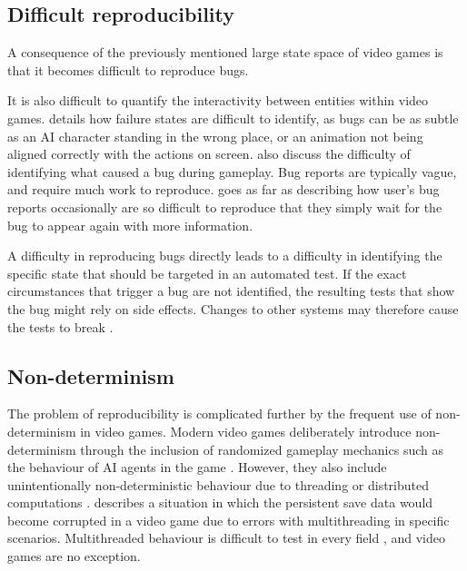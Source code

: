 \documentclass{article}
\begin{document}
    \subsection{Difficult reproducibility}
    A consequence of the previously mentioned large state space of video games is that it becomes difficult to reproduce bugs. 

    It is also difficult to quantify the interactivity between entities within video games. \textcite{gilbert2018unit} details how failure states are difficult to identify, as bugs can be as subtle as an AI character standing in the wrong place, or an animation not being aligned correctly with the actions on screen. \textcite{gilbert2018unit,murphy2014cowboys} also discuss the difficulty of identifying what caused a bug during gameplay. Bug reports are typically vague, and require much work to reproduce. \textcite{yarwood2020qa} goes as far as describing how user's bug reports occasionally are so difficult to reproduce that they simply wait for the bug to appear again with more information. 

    A difficulty in reproducing bugs directly leads to a difficulty in identifying the specific state that should be targeted in an automated test. If the exact circumstances that trigger a bug are not identified, the resulting tests that show the bug might rely on side effects. Changes to other systems may therefore cause the tests to break \parencite{murphy2014cowboys}.

    \subsection{Non-determinism}
    The problem of reproducibility is complicated further by the frequent use of non-determinism in video games. Modern video games deliberately introduce non-determinism through the inclusion of randomized gameplay mechanics such as the behaviour of AI agents in the game \parencite{murphy2014cowboys}. However, they also include unintentionally non-deterministic behaviour due to threading or distributed computations \parencite{murphy2014cowboys}. \textcite{gilbert2018unit} describes a situation in which the persistent save data would become corrupted in a video game due to errors with multithreading in specific scenarios. Multithreaded behaviour is difficult to test in every field \parencite{jagannath2011improved,yang1997challenges}, and video games are no exception.
\end{document}
